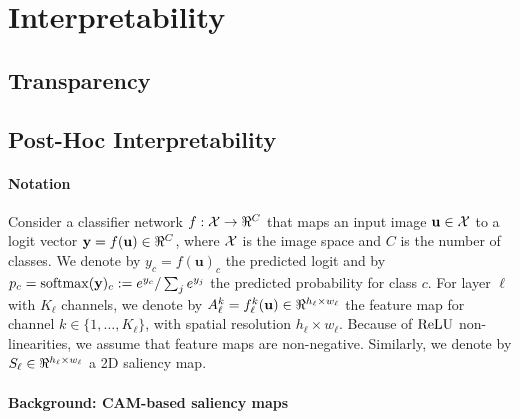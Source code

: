 \section*{Interpretability}
\label{rel:sec_int}

\subsection*{Transparency}
\label{rel:sub_transp}

\subsection*{Post-Hoc Interpretability}
\label{rel:sub_post}

\paragraph{Notation}
\label{sec:oc_notation}

Consider a classifier network $f: \cX \to \real^C$ that maps an input image $\mathbf{u} \in \mathcal{X}$ to a 
logit vector $\vy = f(\mathbf{u}) \in \real^C$, where $\mathcal{X}$ is the image space and $C$ is the number 
of classes. We denote by $y_c = f(\mathbf{u})_c$ the predicted logit and by $p_c = \operatorname{softmax}(\mathbf{y})_c 
\mathrel{:=} e^{y_c} / \sum_j e^{y_j}$ the predicted probability for class $c$. For layer $\ell$ 
with $K_\ell$ channels, we denote by $A^k_\ell = f^k_\ell(\mathbf{u}) \in \real^{h_\ell \times w_\ell}$ 
the feature map for channel $k \in \{1,\dots,K_\ell\}$, with spatial resolution $h_\ell \times 
w_\ell$. Because of ${\operatorname{ReLU}}$ non-linearities, we assume that feature maps are non-negative. 
Similarly, we denote by $S_\ell \in \real^{h_\ell \times w_\ell}$ a 2D saliency map.


\paragraph{Background: CAM-based saliency maps}
\label{sec:oc_back}


